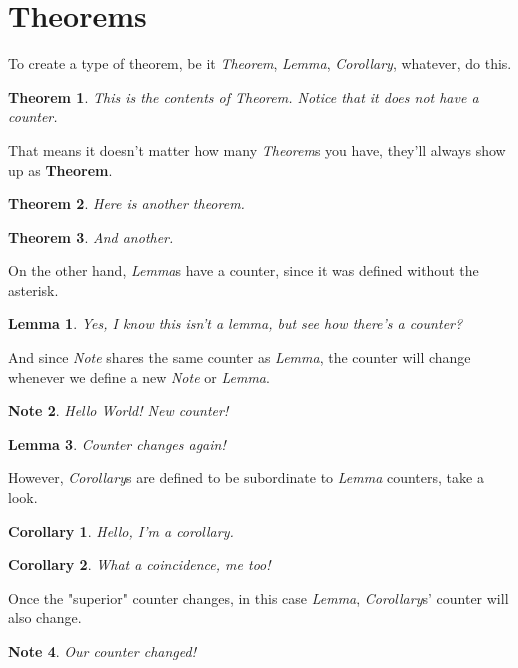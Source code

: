 \documentclass[12pt]{article}
\newtheorem*{Theorem}{Theorem}
\newtheorem{Lemma}{Lemma}
\newtheorem{Corollary}{Corollary}[Lemma]
\newtheorem{Note}[Lemma]{Note}
\begin{document}
\section{Theorems}
To create a type of theorem, be it \emph{Theorem}, \emph{Lemma}, \emph{Corollary}, whatever, do this.

\begin{Theorem}
This is the contents of Theorem. Notice that it does not have a counter.
\end{Theorem}

That means it doesn't matter how many \emph{Theorem}s you have, they'll always show up as \textbf{Theorem}.

\begin{Theorem}
Here is another theorem.
\end{Theorem}

\begin{Theorem}
And another.
\end{Theorem}

On the other hand, \emph{Lemma}s have a counter, since it was defined without the asterisk.

\begin{Lemma}
Yes, I know this isn't a lemma, but see how there's a counter?
\end{Lemma}

And since \emph{Note} shares the same counter as \emph{Lemma}, the counter will change whenever we define
a new \emph{Note} or \emph{Lemma}.

\begin{Note}
Hello World! New counter!
\end{Note}

\begin{Lemma}
Counter changes again!
\end{Lemma}

However, \emph{Corollary}s are defined to be subordinate to \emph{Lemma} counters, take a look.

\begin{Corollary}
Hello, I'm a corollary.
\end{Corollary}

\begin{Corollary}
What a coincidence, me too!
\end{Corollary}

Once the "superior" counter changes, in this case \emph{Lemma}, \emph{Corollary}s' counter will also change.

\begin{Note}
Our counter changed!
\end{Note}
\end{document}
